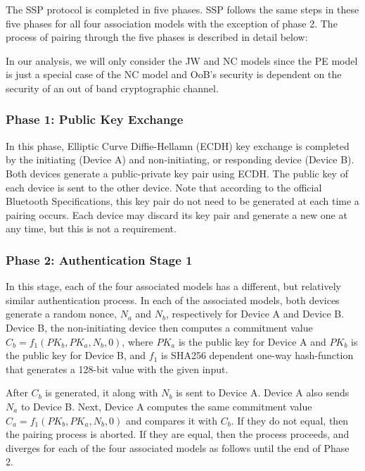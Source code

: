 \documentclass{acm_proc_article-sp}
\begin{document}
The SSP protocol is completed in five phases. SSP follows the same steps in these five phases for all four association models with the exception of phase 2. The process of pairing through the five phases is described in detail below:

In our analysis, we will only consider the JW and NC models since the PE model is just a special case of the NC model and OoB's security is dependent on the security of an out of band cryptographic channel.

\subsubsection{Phase 1: Public Key Exchange}
In this phase, Elliptic Curve Diffie-Hellamn (ECDH) key exchange \cite{mingard} is completed by the initiating (Device A) and non-initiating, or responding device (Device B). Both devices generate a public-private key pair using ECDH. The public key of each device is sent to the other device. Note that according to the official Bluetooth Specifications, this key pair do not need to be generated at each time a pairing occurs. Each device may discard its key pair and generate a new one at any time, but this is not a requirement.

\subsubsection{Phase 2: Authentication Stage 1}
In this stage, each of the four associated models has a different, but relatively similar authentication process. In each of the associated models, both devices generate a random nonce, $N_a$ and $N_b$, respectively for Device A and Device B. Device B, the non-initiating device then computes a commitment value $C_b = f_1(PK_b, PK_a, N_b, 0)$, where $PK_a$ is the public key for Device A and $PK_b$ is the public key for Device B, and $f_1$ is SHA256 dependent one-way hash-function that generates a 128-bit value with the given input.

After $C_b$ is generated, it along with $N_b$ is sent to Device A. Device A also sends $N_a$ to Device B. Next, Device A computes the same commitment value $C_a = f_1(PK_b, PK_a, N_b, 0)$ and compares it with $C_b$. If they do not equal, then the pairing process is aborted. If they are equal, then the process proceeds, and diverges for each of the four associated models as follows until the end of Phase 2.
\end{document}
